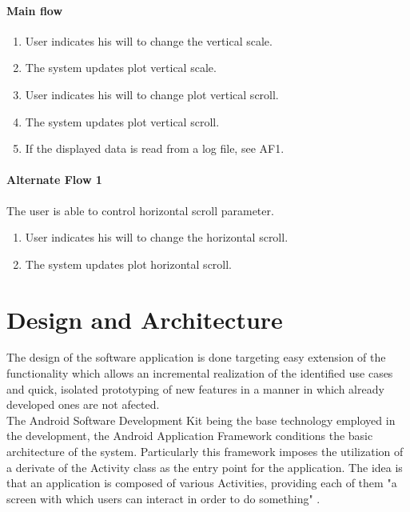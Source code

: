 			\paragraph{Main flow}
				\begin{enumerate}
				\item User indicates his will to change the vertical scale.
				\item The system updates plot vertical scale.
				\item User indicates his will to change plot vertical scroll.
				\item The system updates plot vertical scroll.
				\item If the displayed data is read from a log file, see AF1.
				\end{enumerate}
			
			\paragraph{Alternate Flow 1} The user is able to control horizontal scroll parameter.	
				\begin{enumerate}
				\item User indicates his will to change the horizontal scroll.
				\item The system updates plot horizontal scroll.
				\end{enumerate}

	\section{Design and Architecture}

		The design of the software application is done targeting easy extension of the functionality which allows an incremental realization of the identified use cases and quick, isolated prototyping of new features in a manner in which already developed ones are not afected.\\

		The Android Software Development Kit being the base technology employed in the development, the Android Application Framework conditions the basic architecture of the system. Particularly this framework imposes the utilization of a derivate of the Activity class as the entry point for the application. The idea is that an application is composed of various Activities, providing each of them "a screen with which users can interact in order to do something" .\\

